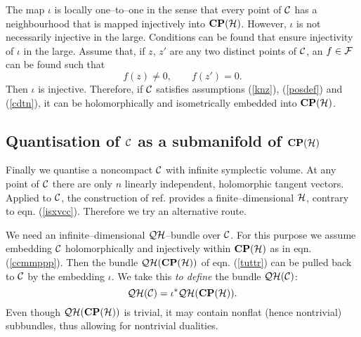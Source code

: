 \documentclass[a4paper,a4paper]{article}
\begin{document}
The map $\iota$ is locally one--to--one in the sense that every point of ${\cal C}$ 
has a neighbourhood that is mapped injectively into ${\bf CP}({\cal H})$. 
However, $\iota$ is not necessarily injective in the large. Conditions can 
be found that ensure injectivity of $\iota$ in the large. Assume 
that, if $z$, $z'$ are any two distinct points of ${\cal C}$, an 
$f\in{\cal F}$ can be found such that
\begin{equation}
f(z)\neq 0,\qquad f(z')=0.
\label{cdtn}
\end{equation}
Then $\iota$ is injective. Therefore, if ${\cal C}$ satisfies assumptions (\ref{knz}), 
(\ref{posdef}) and (\ref{cdtn}), it can be holomorphically and isometrically embedded 
into ${\bf CP}({\cal H})$.


\subsection{Quantisation of ${\cal C}$ as a submanifold of ${\bf CP}({\cal H})$}
\label{qqcccepeh}


Finally we quantise a noncompact ${\cal C}$ with infinite symplectic volume.
At any point of ${\cal C}$ there are only $n$ linearly independent, holomorphic tangent vectors. 
Applied to ${\cal C}$, the construction of ref. \cite{PQM} provides a finite--dimensional 
${\cal H}$, contrary to eqn. (\ref{isxvcc}). Therefore we try an alternative route.

We need an infinite--dimensional ${\cal QH}$--bundle over ${\cal C}$. 
For this purpose we assume embedding ${\cal C}$ holomorphically 
and injectively within ${\bf CP}({\cal H})$ as in eqn. (\ref{ccmmppp}). 
Then the bundle ${\cal QH}({\bf CP}({\cal H}))$ of eqn. (\ref{tuttr}) can 
be pulled back to ${\cal C}$ by the embedding $\iota$. We take this {\it to define}\/
the bundle ${\cal QH}({\cal C})$:
\begin{equation}
{\cal QH}({\cal C}) = \iota^* {\cal QH}({\bf CP}({\cal H})).
\label{ppbbac}
\end{equation}
Even though ${\cal QH}({\bf CP}({\cal H}))$ is trivial, it may contain nonflat (hence nontrivial) 
subbundles, thus allowing for nontrivial dualities.
\end{document}
